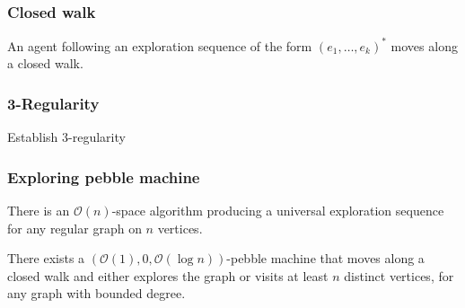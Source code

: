 \documentclass{beamer}
\begin{document}
\begin{frame}
  \frametitle{Closed walk}
  \begin{mdframed}[linecolor=yellow]
    \begin{lemma}
      An agent following an exploration sequence of the form
      $(e_{1},\dots,e_{k})^{\ast}$ moves along a closed walk.
    \end{lemma}
  \end{mdframed}
\end{frame}

\begin{frame}
  \frametitle{3-Regularity}
  \begin{mdframed}[linecolor=green]
    Establish 3-regularity
  \end{mdframed}
  \begin{center}
  \end{center}
\end{frame}

\begin{frame}
  \frametitle{Exploring pebble machine}
  \begin{theorem}[Reingold]
    There is an $\mathcal{O}(n)$-space algorithm producing a universal
    exploration sequence for any regular graph on $n$ vertices.
  \end{theorem}
  \begin{center}
  \end{center}
  \begin{theorem}
    There exists a $(\mathcal{O}(1), 0, \mathcal{O}(\log n))$-pebble machine
    that moves along a closed walk and either explores the graph or visits at
    least $n$ distinct vertices, for any graph with bounded degree.
  \end{theorem}
\end{frame}
\end{document}
